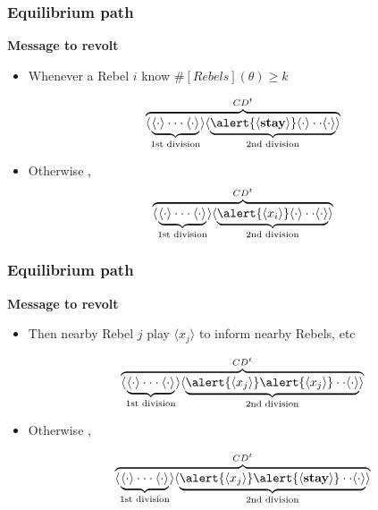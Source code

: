 \documentclass[10pt]{beamer}
\begin{document}
\begin{frame}
\frametitle{Equilibrium path}

\textbf{Message to \textbf{revolt}}

\begin{itemize}
\item Whenever a Rebel $i$ know \alert{$\#[Rebels](\theta)\geq k$}

\[\overbrace{\langle\underbrace{\langle \cdot \rangle \cdot \cdot \cdot \langle \cdot \rangle}_{\text{1st division}}\rangle \langle\underbrace{\alert{\langle \textbf{stay} \rangle} \langle \cdot \rangle \cdot \cdot \langle \cdot \rangle}_{\text{2nd division}} \rangle }^{CD^t}\] 

\item \alert{Otherwise} ,
\[\overbrace{\langle\underbrace{\langle \cdot \rangle \cdot \cdot \cdot \langle \cdot \rangle}_{\text{1st division}}\rangle \langle\underbrace{\alert{\langle x_i \rangle} \langle \cdot \rangle \cdot \cdot \langle \cdot \rangle}_{\text{2nd division}} \rangle }^{CD^t}\]
\end{itemize}

\end{frame}


\begin{frame}
\frametitle{Equilibrium path}

\textbf{Message to \textbf{revolt}}

\begin{itemize}
\item Then nearby Rebel $j$ \alert{play $\langle x_j \rangle$ to inform nearby Rebels, etc}

\[\overbrace{\langle\underbrace{\langle \cdot \rangle \cdot \cdot \cdot \langle \cdot \rangle}_{\text{1st division}}\rangle \langle\underbrace{\alert{\langle x_j \rangle} \alert{\langle x_j \rangle} \cdot \cdot \langle \cdot \rangle}_{\text{2nd division}} \rangle }^{CD^t}\] 

\item \alert{Otherwise} ,

\[\overbrace{\langle\underbrace{\langle \cdot \rangle \cdot \cdot \cdot \langle \cdot \rangle}_{\text{1st division}}\rangle \langle\underbrace{\alert{\langle x_j \rangle} \alert{\langle \textbf{stay} \rangle} \cdot \cdot \langle \cdot \rangle}_{\text{2nd division}} \rangle }^{CD^t}\] 

\end{itemize}

\end{frame}
\end{document}

